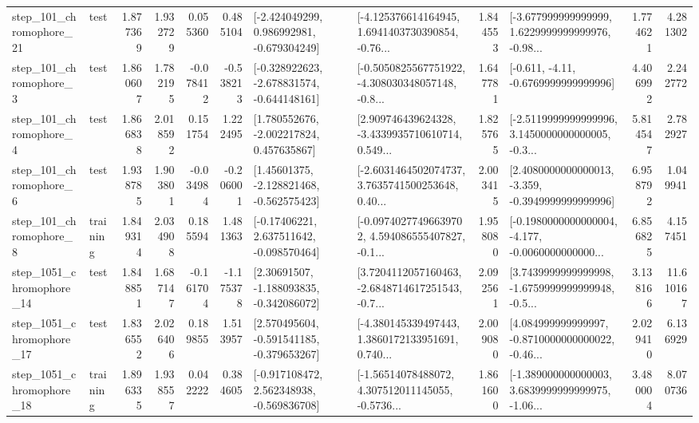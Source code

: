 \begin{tabular}{llrrrrllrlrr}
  step\_101\_chromophore\_21 &      test &      1.877369 &    1.932729 &      0.055360 &  0.485104 &   [-2.424049299, 0.986992981, -0.679304249] &  [-4.125376614164945, 1.6941403730390854, -0.76... &       1.844553 &  [-3.677999999999999, 1.6229999999999976, -0.98... &            1.774621 &          4.281302 \\
   step\_101\_chromophore\_3 &      test &      1.860607 &    1.782195 &     -0.078412 & -0.538213 &  [-0.328922623, -2.678831574, -0.644148161] &  [-0.5050825567751922, -4.308030348057148, -0.8... &       1.647781 &               [-0.611, -4.11, -0.6769999999999996] &            4.406992 &          2.242772 \\
   step\_101\_chromophore\_4 &      test &      1.866838 &    2.018592 &      0.151754 &  1.222495 &    [1.780552676, -2.002217824, 0.457635867] &  [2.909746439624328, -3.4339935710610714, 0.549... &       1.825765 &  [-2.5119999999999996, 3.1450000000000005, -0.3... &            5.814547 &          2.782927 \\
   step\_101\_chromophore\_6 &      test &      1.938785 &    1.903801 &     -0.034984 & -0.206001 &    [1.45601375, -2.128821468, -0.562575423] &  [-2.6031464502074737, 3.7635741500253648, 0.40... &       2.003415 &  [2.4080000000000013, -3.359, -0.3949999999999996] &            6.958792 &          1.049941 \\
   step\_101\_chromophore\_8 &  training &      1.849314 &    2.034908 &      0.185594 &  1.481363 &    [-0.17406221, 2.637511642, -0.098570464] &  [-0.09740277496639702, 4.594086555407827, -0.1... &       1.958080 &  [-0.1980000000000004, -4.177, -0.0060000000000... &            6.856825 &          4.157451 \\
 step\_1051\_chromophore\_14 &      test &      1.848851 &    1.687147 &     -0.161704 & -1.175378 &    [2.30691507, -1.188093835, -0.342086072] &  [3.7204112057160463, -2.6848714617251543, -0.7... &       2.092561 &  [3.7439999999999998, -1.6759999999999948, -0.5... &            3.138166 &         11.610167 \\
 step\_1051\_chromophore\_17 &      test &      1.836552 &    2.026406 &      0.189855 &  1.513957 &   [2.570495604, -0.591541185, -0.379653267] &  [-4.380145339497443, 1.3860172133951691, 0.740... &       2.009080 &  [4.084999999999997, -0.8710000000000022, -0.46... &            2.029410 &          6.136929 \\
 step\_1051\_chromophore\_18 &  training &      1.896335 &    1.938557 &      0.042222 &  0.384605 &   [-0.917108472, 2.562348938, -0.569836708] &  [-1.56514078488072, 4.307512011145055, -0.5736... &       1.861600 &  [-1.389000000000003, 3.6839999999999975, -1.06... &            3.480004 &          8.070736 \\

\end{tabular}
